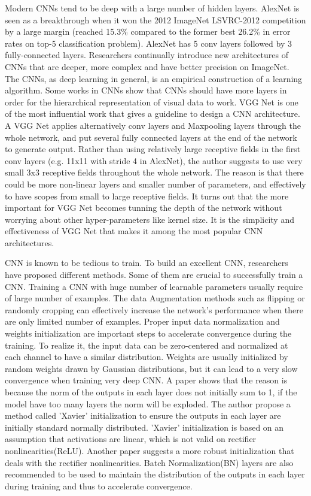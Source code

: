 Modern CNNs tend to be deep with a large number of hidden layers. AlexNet is seen as a breakthrough when it won the 2012 ImageNet LSVRC-2012 competition by a large margin (reached 15.3\% compared to the former best 26.2\% in error rates on top-5 classification problem). AlexNet has 5 conv layers followed by 3 fully-connected layers. Researchers continually introduce new architectures of CNNs that are deeper, more complex and have better precision on ImageNet. The CNNs, as deep learning in general, is an empirical construction of a learning algorithm. Some works in CNNs show that CNNs should have more layers in order for the hierarchical representation of visual data to work\cite{he2016deep}. VGG Net\cite{simonyan2014very} is one of the most influential work that gives a guideline to design a CNN architecture. A VGG Net applies alternatively conv layers and Maxpooling layers through the whole network, and put several fully connected layers at the end of the network to generate output. Rather than using relatively large receptive fields in the first conv layers (e.g. 11x11 with stride 4 in AlexNet\cite{krizhevsky2012imagenet}), the author suggests to use very small 3x3 receptive fields throughout the whole network. The reason is that there could be more non-linear layers and smaller number of parameters, and effectively to have scopes from small to large receptive fields. It turns out that the more important for VGG Net becomes tunning the depth of the network without worrying about other hyper-parameters like kernel size. It is the simplicity and effectiveness of VGG Net that makes it among the most popular CNN architectures. 

CNN is known to be tedious to train. To build an excellent CNN, researchers have proposed different methods. Some of them are crucial to successfully train a CNN. Training a CNN with huge number of learnable parameters usually require of large number of examples. The data Augmentation methods such as flipping or randomly cropping can effectively increase the network's performance when there are only limited number of examples. Proper input data normalization and weights initialization are important steps to accelerate convergence during the training. To realize it, the input data can be zero-centered and normalized at each channel to have a similar distribution. Weights are usually initialized by random weights drawn by Gaussian distributions\cite{krizhevsky2012imagenet}, but it can lead to a very slow convergence when training very deep CNN. A paper\cite{glorot2010understanding} shows that the reason is because the norm of the outputs in each layer does not initially sum to 1, if the model have too many layers the norm will be exploded. The author propose a method called 'Xavier' initialization to ensure the outputs in each layer are initially standard normally distributed. 'Xavier' initialization is based on an assumption that activations are linear, which is not valid on rectifier nonlinearities(ReLU). Another paper\cite{he2015delving} suggests a more robust initialization that deals with the rectifier nonlinearities. Batch Normalization(BN) layers are also recommended to be used to maintain the distribution of the outputs in each layer during training and thus to accelerate convergence\cite{krizhevsky2012imagenet}. 

